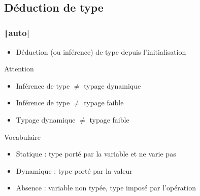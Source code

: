 \documentclass[C++.tex]{subfiles}
\begin{document}
\subsection*{Déduction de type}
\begin{frame}[fragile]
	\frametitle{\texttt|auto|}
	\begin{itemize}
		\item Déduction (ou inférence) de type depuis l'initialisation

	\end{itemize}

	\begin{alertblock}{Attention}
		\begin{itemize}
			\item Inférence de type $\neq$ typage dynamique
			\item Inférence de type $\neq$ typage faible
			\item Typage dynamique $\neq$ typage faible
		\end{itemize}
	\end{alertblock}

	\begin{block}{Vocabulaire}
		\begin{itemize}
			\item Statique : type porté par la variable et ne varie pas
			\item Dynamique : type porté par la valeur
			\item Absence : variable non typée, type imposé par l'opération
		\end{itemize}
	\end{block}
\end{frame}
\end{document}
